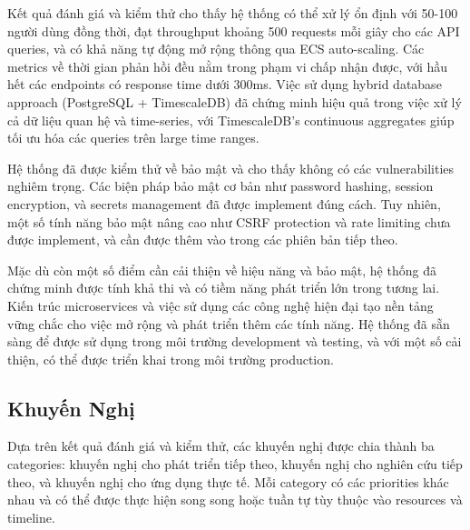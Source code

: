 Kết quả đánh giá và kiểm thử cho thấy hệ thống có thể xử lý ổn định với 50-100 người dùng đồng thời, đạt throughput khoảng 500 requests mỗi giây cho các API queries, và có khả năng tự động mở rộng thông qua ECS auto-scaling. Các metrics về thời gian phản hồi đều nằm trong phạm vi chấp nhận được, với hầu hết các endpoints có response time dưới 300ms. Việc sử dụng hybrid database approach (PostgreSQL + TimescaleDB) đã chứng minh hiệu quả trong việc xử lý cả dữ liệu quan hệ và time-series, với TimescaleDB's continuous aggregates giúp tối ưu hóa các queries trên large time ranges.

Hệ thống đã được kiểm thử về bảo mật và cho thấy không có các vulnerabilities nghiêm trọng. Các biện pháp bảo mật cơ bản như password hashing, session encryption, và secrets management đã được implement đúng cách. Tuy nhiên, một số tính năng bảo mật nâng cao như CSRF protection và rate limiting chưa được implement, và cần được thêm vào trong các phiên bản tiếp theo.

Mặc dù còn một số điểm cần cải thiện về hiệu năng và bảo mật, hệ thống đã chứng minh được tính khả thi và có tiềm năng phát triển lớn trong tương lai. Kiến trúc microservices và việc sử dụng các công nghệ hiện đại tạo nền tảng vững chắc cho việc mở rộng và phát triển thêm các tính năng. Hệ thống đã sẵn sàng để được sử dụng trong môi trường development và testing, và với một số cải thiện, có thể được triển khai trong môi trường production.

\subsection{Khuyến Nghị}

Dựa trên kết quả đánh giá và kiểm thử, các khuyến nghị được chia thành ba categories: khuyến nghị cho phát triển tiếp theo, khuyến nghị cho nghiên cứu tiếp theo, và khuyến nghị cho ứng dụng thực tế. Mỗi category có các priorities khác nhau và có thể được thực hiện song song hoặc tuần tự tùy thuộc vào resources và timeline.

